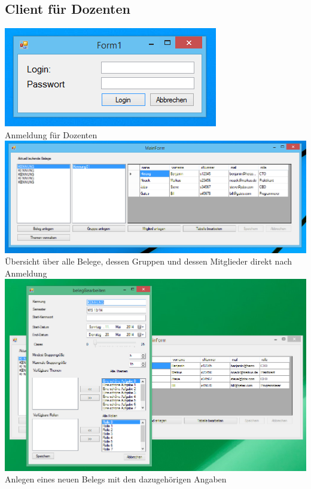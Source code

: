 \documentclass{article}
\begin{document}
\subsection{Client für Dozenten}
\begin{center}
    \includegraphics{bilder/doz1.PNG}\\
    Anmeldung für Dozenten \\
    
    \includegraphics[scale=0.6]{bilder/doz2.PNG}\\
    Übersicht über alle Belege, dessen Gruppen und dessen Mitglieder direkt nach Anmeldung \\
    
    \includegraphics[scale=0.6]{bilder/doz3.PNG}\\
    Anlegen eines neuen Belegs mit den dazugehörigen Angaben \\
    

\end{center}
\end{document}
